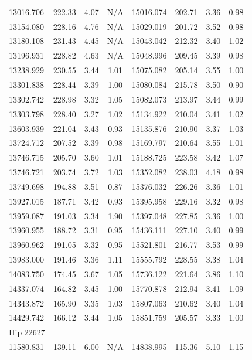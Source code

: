 {\begin{longtable}{l|ccc||l|ccc}
13016.706 & 222.33 & 4.07 & N/A & 15016.074 & 202.71 & 3.36 & 0.98 \\  
13154.080 & 228.16 & 4.76 & N/A & 15029.019 & 201.72 & 3.52 & 0.98 \\  
13180.108 & 231.43 & 4.45 & N/A & 15043.042 & 212.32 & 3.40 & 1.02 \\  
13196.931 & 228.82 & 4.63 & N/A & 15048.996 & 209.45 & 3.39 & 0.98 \\  
13238.929 & 230.55 & 3.44 & 1.01 & 15075.082 & 205.14 & 3.55 & 1.00 \\  
13301.838 & 228.44 & 3.39 & 1.00 & 15080.084 & 215.78 & 3.50 & 0.90 \\  
13302.742 & 228.98 & 3.32 & 1.05 & 15082.073 & 213.97 & 3.44 & 0.99 \\  
13303.798 & 228.40 & 3.27 & 1.02 & 15134.922 & 210.04 & 3.41 & 1.02 \\  
13603.939 & 221.04 & 3.43 & 0.93 & 15135.876 & 210.90 & 3.37 & 1.03 \\  
13724.712 & 207.52 & 3.39 & 0.98 & 15169.797 & 210.64 & 3.55 & 1.01 \\  
13746.715 & 205.70 & 3.60 & 1.01 & 15188.725 & 223.58 & 3.42 & 1.07 \\  
13746.721 & 203.74 & 3.72 & 1.03 & 15352.082 & 238.03 & 4.18 & 0.98 \\  
13749.698 & 194.88 & 3.51 & 0.87 & 15376.032 & 226.26 & 3.36 & 1.01 \\  
13927.015 & 187.71 & 3.42 & 0.93 & 15395.958 & 229.16 & 3.32 & 0.98 \\  
13959.087 & 191.03 & 3.34 & 1.90 & 15397.048 & 227.85 & 3.36 & 1.00 \\  
13960.955 & 188.72 & 3.31 & 0.95 & 15436.111 & 227.10 & 3.40 & 0.99 \\  
13960.962 & 191.05 & 3.32 & 0.95 & 15521.801 & 216.77 & 3.53 & 0.99 \\  
13983.000 & 191.46 & 3.36 & 1.11 & 15555.792 & 228.55 & 3.38 & 1.04 \\  
14083.750 & 174.45 & 3.67 & 1.05 & 15736.122 & 221.64 & 3.86 & 1.10 \\  
14337.074 & 164.82 & 3.45 & 1.00 & 15770.878 & 212.94 & 3.41 & 1.09 \\  
14343.872 & 165.90 & 3.35 & 1.03 & 15807.063 & 210.62 & 3.40 & 1.04 \\  
14429.742 & 166.12 & 3.44 & 1.05 & 15851.759 & 205.57 & 3.33 & 1.00 \\  
\hline
Hip 22627 & & & & & & & \\ 
11580.831 & 139.11 & 6.00 & N/A & 14838.995 & 115.36 & 5.10 & 1.15 \\  

\end{longtable}}

